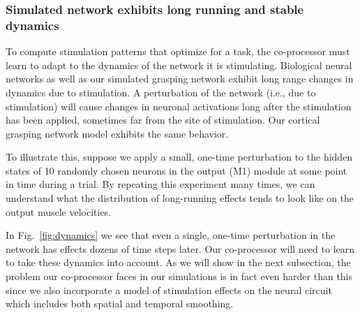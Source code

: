 \documentclass[12pt]{iopart}
\begin{document}
\subsubsection{Simulated network exhibits long running and stable dynamics}
To compute stimulation patterns that optimize for a task, the co-processor must
learn to adapt to the dynamics of the network it is stimulating. Biological neural
networks as well as our simulated grasping network exhibit long range changes in dynamics
due to stimulation. A perturbation of the network (i.e., due to stimulation) will cause
changes in neuronal activations long after the stimulation has been applied, sometimes far
from the site of stimulation. Our cortical grasping network model exhibits the same
behavior.

To illustrate this, suppose we apply a small, one-time perturbation
to the hidden states of 10 randomly chosen neurons in the output (M1) module at some point
in time during a trial. By repeating this experiment many times, we can understand what the
distribution of long-running effects tends to look like on the output muscle velocities.

In Fig.~\ref{fig:dynamics} we see that even a single, one-time perturbation in
the network has effects dozens of time steps later. Our co-processor will need to learn to take
these dynamics into account. As we will show in the next subsection, the problem our co-processor
faces in our simulations is in fact even harder than this since we also incorporate
a model of stimulation effects on the neural circuit which includes both spatial and temporal
smoothing.
\end{document}
